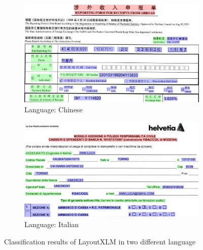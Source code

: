 \begin{figure}[!ht]
    \begin{subfigure}{\textwidth}
    \centering
    \includegraphics[scale=0.3]{chapters/images/Literature_review/LayoutXLM_Results_Chinese.JPG}
    \caption{Language: Chinese}
    \label{subfig:a}
    \end{subfigure}
    \begin{subfigure}{\textwidth}
    \centering
    \includegraphics[scale=0.3]{chapters/images/Literature_review/LayoutXLM_Results_Italian.JPG}
    \caption{Language: Italian}
    \label{subfig:b}
    \end{subfigure}
    \caption{Classification results of LayoutXLM in two different language \cite{xu2021layoutxlm}}\label{fig:result_of_LayoutXLM}
\end{figure}









